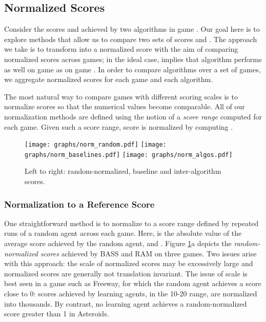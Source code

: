 \documentclass[twoside,11pt]{article}
\newcommand{\gamename}[1]{{\sc #1}}
\begin{document}
\subsection{Normalized Scores}

Consider the scores  and  achieved by two algorithms in game . Our goal here is to explore methods that allow us to compare two sets of scores  and . The approach we take is to transform  into a normalized score  with the aim of comparing normalized scores across games; in the ideal case,  implies that algorithm  performs as well on game  as on game . In order to compare algorithms over a set of games, we aggregate normalized scores for each game and each algorithm. 

The most natural way to compare games with different scoring scales is to normalize scores so that the numerical values become comparable. All of our normalization methods are defined using the notion of a  \emph{score range}  computed for each game. Given such a score range, score  is normalized by computing .

\begin{figure}
\begin{center}
\texttt{[image: graphs/norm\_random.pdf]}
\hspace{-1em}
\texttt{[image: graphs/norm\_baselines.pdf]}
\hspace{-1em}
\texttt{[image: graphs/norm\_algos.pdf]}
\caption{Left to right: random-normalized, baseline and inter-algorithm scores.\label{fig:evaluation:normalized_scores}}
\end{center}
\end{figure}

\subsubsection{Normalization to a Reference Score}

One straightforward method is to normalize to a score range defined by repeated runs of a random agent across each game. Here,  is the absolute value of the average score achieved by the random agent, and . 
Figure \ref{fig:evaluation:normalized_scores}a depicts the \emph{random-normalized scores} achieved by BASS and RAM on three games.  Two issues arise with this approach: the scale of normalized scores may be excessively large and normalized scores are generally not translation invariant. 
The issue of scale is best seen in a game such as \gamename{Freeway}, for which the random agent achieves a score close to 0: scores achieved by learning agents, in the 10-20 range, are normalized into thousands. 
By contrast, no learning agent achieves a random-normalized score greater than 1 in Asteroids. 
\end{document}
